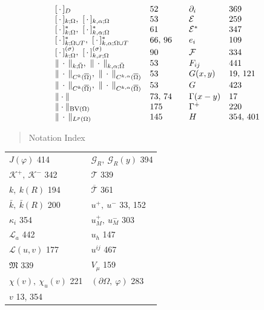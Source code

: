 \[\begin{array}{@{}ll@{\qquad}ll@{}}
{}[\,\cdot\,]_{D} & 52 &
\partial_i & 369\\
{}[\,\cdot\,]_{k;\Omega},\ [\,\cdot\,]_{k,\alpha;\Omega} & 53 &
\mathcal{E} & 259\\
{}[\,\cdot\,]^*_{k;\Omega},\ [\,\cdot\,]^*_{k,\alpha;\Omega} & 61 &
\mathcal{E}^* & 347\\
{}[\,\cdot\,]^*_{k;\Omega\cup T},\ [\,\cdot\,]^*_{k,\alpha;\Omega\cup T} & 66,\,96 &
e_i & 109\\
{}[\,\cdot\,]^{(\sigma)}_{k;\Omega},\ [\,\cdot\,]^{(\sigma)}_{k,x;\Omega} & 90 &
\mathcal{F} & 334\\
\|\,\cdot\,\|_{k;\bar{\Omega}},\ \|\,\cdot\,\|_{k,\alpha;\bar{\Omega}} & 53 &
F_{ij} & 441\\
\|\,\cdot\,\|_{C^k(\overline{\Omega})},\ \|\,\cdot\,\|_{C^{k,\alpha}(\overline{\Omega})} & 53 &
G(x,y) & 19,\,121\\
\|\,\cdot\,\|_{C^k(\overline{\Omega})},\ \|\,\cdot\,\|_{C^{k,\alpha}(\overline{\Omega})} & 53 &
G & 423\\
\|\cdot\| & 73,\,74 &
\Gamma(x-y) & 17\\
\|\cdot\|_{\mathrm{BV}(\Omega)} & 175 &
\Gamma^+ & 220\\
\|\,\cdot\,\|_{L^p(\Omega)} & 145 &
H & 354,\,401
\end{array}
\]


\begin{quote}
Notation Index
\end{quote}

\noindent
\begin{tabular}{@{}p{}p{}@{}}
$J(\varphi)$ 414 & $\mathcal{G}_R,\ \mathcal{G}_R(y)$ 394\\
$\mathcal{K}^+,\ \mathcal{K}^-$ 342 & $\mathcal{T}$ 339\\
$k,\ k(R)$ 194 & $\overline{\mathcal{T}}$ 361\\
$\bar{k},\ \bar{k}(R)$ 200 & $u^+,\ u^-$ 33, 152\\
$\kappa_i$ 354 & $u_M^+,\ u_M^-$ 303\\
$\mathcal{L}_a$ 442 & $u_h$ 147\\
$\mathcal{L}(u, v)$ 177 & $u^{ij}$ 467\\
$\mathfrak{M}$ 339 & $V_\mu$ 159\\
$\chi(v),\ \chi_u(v)$ 221 & $(\partial\Omega,\ \varphi)$ 283\\
$v$ 13, 354 & \\
\end{tabular}


